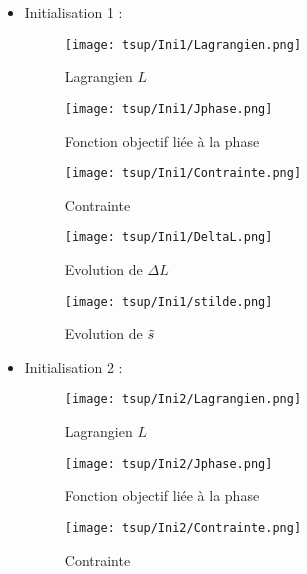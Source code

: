 \documentclass[11pt,a4paper]{article}
\begin{document}
\begin{itemize}
	\item Initialisation 1 :
	
	\begin{figure}[H]
		\begin{minipage}{0.33\textwidth}
			\centering
			\texttt{[image: tsup/Ini1/Lagrangien.png]}
			\caption{Lagrangien $L$}
		\end{minipage}
		\begin{minipage}{0.33\textwidth}
			\centering
			\texttt{[image: tsup/Ini1/Jphase.png]}
			\caption{Fonction objectif liée à la phase}
		\end{minipage}
		\begin{minipage}{0.33\textwidth}
			\centering
			\texttt{[image: tsup/Ini1/Contrainte.png]}
			\caption{Contrainte}
		\end{minipage}
	\end{figure}
	
	\begin{figure}[H]
		\begin{minipage}{0.45\textwidth}
			\centering
			\texttt{[image: tsup/Ini1/DeltaL.png]}
			\caption{Evolution de $\Delta L$}
		\end{minipage}
		\begin{minipage}{0.45\textwidth}
			\centering
			\texttt{[image: tsup/Ini1/stilde.png]}
			\caption{Evolution de $\tilde{s}$}
		\end{minipage}
	\end{figure}
	
	\item Initialisation 2 :
	
	\begin{figure}[H]
		\begin{minipage}{0.33\textwidth}
			\centering
			\texttt{[image: tsup/Ini2/Lagrangien.png]}
			\caption{Lagrangien $L$}
		\end{minipage}
		\begin{minipage}{0.33\textwidth}
			\centering
			\texttt{[image: tsup/Ini2/Jphase.png]}
			\caption{Fonction objectif liée à la phase}
		\end{minipage}
		\begin{minipage}{0.33\textwidth}
			\centering
			\texttt{[image: tsup/Ini2/Contrainte.png]}
			\caption{Contrainte}
		\end{minipage}
	\end{figure}
	

\end{itemize}
\end{document}
